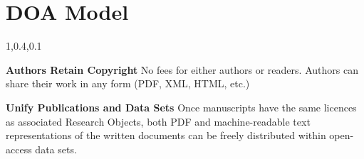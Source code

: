 
\section{DOA Model}\fbeg{}\begin{frame}{}

\vspace{-1em}	

{\Large{}\selectfont
\hspace*{-20pt}\begin{minipage}{1.08\textwidth}
\vspace{-4pt}


		
\begin{lightquadblockc}{1,0.4,0.1}{\parbox{21cm}{\centering \vspace{13pt}\color[rgb]{0,0,0}{According 
to the Diamond (DOA) model, publications have neither 
Article Processing Charges (APCs) nor paywalls}\vspace{8pt}}}
\hspace{-4pt}\begin{minipage}{1.07\textwidth}
{\fontsize{16}{22}\selectfont \setlength{\leftmargini}{30pt}\begin{enumerate}

\dmitem \textbf{Authors Retain Copyright} \hspace{.5em} No fees for either authors or readers. 
Authors can share their work in any form (PDF, XML, HTML, etc.) \vspace{12pt} 

\dmitem \textbf{Unify Publications and Data Sets} \hspace{.5em} Once manuscripts 
have the same licences as associated Research Objects, both PDF 
and machine-readable text representations of the written documents 
can be freely distributed within open-access data sets.\\\vspace{-12pt}
\hspace{7pt}\raisebox{-11pt}{\MySquare{}}\hspace{12pt}\parbox[t]{21cm}{%
{\fontsize{14}{14}\selectfont {\color[rgb]{0.1,0.4,0.5}{This makes PDF customization 
and embedded full-text search possible}}}}\vspace{12pt}
  

\end{enumerate}}
\end{minipage}
\end{lightquadblockc}
\end{minipage}}
\end{frame}
